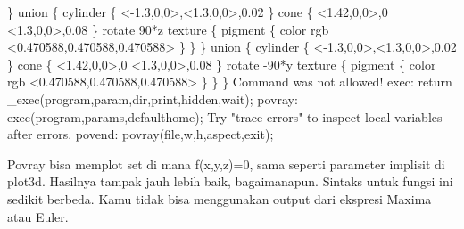 \documentclass[a4paper,10pt]{article}
\begin{document}
\begin{eulernotebook}
\begin{eulercomment}
\begin{eulercomment}
\begin{euleroutput}
  \}
  union \{
    cylinder \{ <-1.3,0,0>,<1.3,0,0>,0.02 \}
    cone \{ 
      <1.42,0,0>,0
      <1.3,0,0>,0.08
    \}
    rotate 90*z
    texture \{ pigment \{ color rgb <0.470588,0.470588,0.470588> \} \}
  \}
  union \{
    cylinder \{ <-1.3,0,0>,<1.3,0,0>,0.02 \}
    cone \{ 
      <1.42,0,0>,0
      <1.3,0,0>,0.08
    \}
    rotate -90*y
    texture \{ pigment \{ color rgb <0.470588,0.470588,0.470588> \} \}
  \}
  Command was not allowed!
  exec:
      return _exec(program,param,dir,print,hidden,wait);
  povray:
      exec(program,params,defaulthome);
  Try "trace errors" to inspect local variables after errors.
  povend:
      povray(file,w,h,aspect,exit); 
\end{euleroutput}
\begin{eulercomment}
Povray bisa memplot set di mana f(x,y,z)=0, sama seperti parameter
implisit di plot3d. Hasilnya tampak jauh lebih baik, bagaimanapun.
Sintaks untuk fungsi ini sedikit berbeda. Kamu tidak bisa menggunakan
output dari ekspresi Maxima atau Euler.


\end{eulercomment}
\end{eulercomment}
\end{eulercomment}
\end{eulernotebook}
\end{document}
